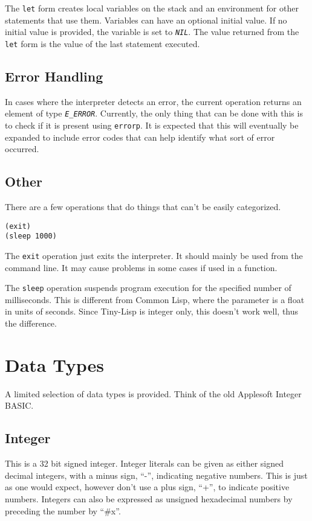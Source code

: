 \documentclass[10pt, openany]{book}
\newcommand{\function}[1]{\texttt{#1}}
\newcommand{\constant}[1]{\emph{\texttt{#1}}}
\newcommand{\keyword}[1]{\texttt{#1}}
\newcommand{\tl}{Tiny-Lisp}
\newcommand{\cl}{Common Lisp}
\begin{document}
The \function{let} form creates local variables on the stack and an environment for other statements that use them.  Variables can have an optional initial value.  If no initial value is provided, the variable is set to \constant{NIL}.  The value returned from the \function{let} form is the value of the last statement executed.

\subsection{Error Handling}
In cases where the interpreter detects an error, the current operation returns an element of type \constant{E\_ERROR}.  Currently, the only thing that can be done with this is to check if it is present using \keyword{errorp}.  It is expected that this will eventually be expanded to include error codes that can help identify what sort of error occurred.

\subsection{Other}
There are a few operations that do things that can't be easily categorized.

\begin{lstlisting}
(exit)
(sleep 1000)
\end{lstlisting}

The \function{exit} operation just exits the interpreter.  It should mainly be used from the command line.  It may cause problems in some cases if used in a function.

The \function{sleep} operation suspends program execution for the specified number of milliseconds.  This is different from \cl, where the parameter is a float in units of seconds.  Since \tl{} is integer only, this doesn't work well, thus the difference.

\section{Data Types}
A limited selection of data types is provided.  Think of the old Applesoft Integer BASIC.

\subsection{Integer}
This is a 32 bit signed integer.  Integer literals can be given as either signed decimal integers, with a minus sign, ``-'', indicating negative numbers.  This is just as one would expect, however don't use a plus sign, ``+'', to indicate positive numbers.  Integers can also be expressed as unsigned hexadecimal numbers by preceding the number by ``\#x''.
\end{document}

